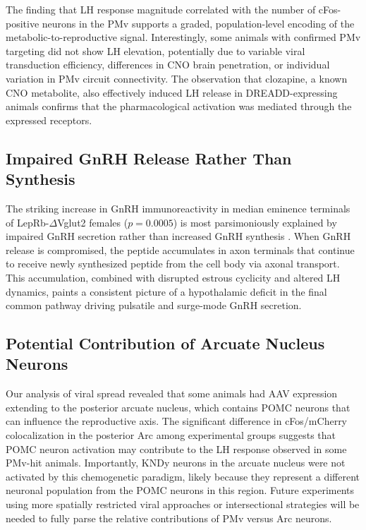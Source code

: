 \documentclass[12pt]{article}
\begin{document}
The finding that LH response magnitude correlated with the number of cFos-positive neurons in the PMv supports a graded, population-level encoding of the metabolic-to-reproductive signal. Interestingly, some animals with confirmed PMv targeting did not show LH elevation, potentially due to variable viral transduction efficiency, differences in CNO brain penetration, or individual variation in PMv circuit connectivity. The observation that clozapine, a known CNO metabolite, also effectively induced LH release in DREADD-expressing animals confirms that the pharmacological activation was mediated through the expressed receptors.

\subsection{Impaired GnRH Release Rather Than Synthesis}

The striking increase in GnRH immunoreactivity in median eminence terminals of LepRb-$\Delta$Vglut2 females ($p = 0.0005$) is most parsimoniously explained by impaired GnRH secretion rather than increased GnRH synthesis \citep{herbison2016gnrh, manfredi2019gnrh}. When GnRH release is compromised, the peptide accumulates in axon terminals that continue to receive newly synthesized peptide from the cell body via axonal transport. This accumulation, combined with disrupted estrous cyclicity and altered LH dynamics, paints a consistent picture of a hypothalamic deficit in the final common pathway driving pulsatile and surge-mode GnRH secretion.

\subsection{Potential Contribution of Arcuate Nucleus Neurons}

Our analysis of viral spread revealed that some animals had AAV expression extending to the posterior arcuate nucleus, which contains POMC neurons that can influence the reproductive axis. The significant difference in cFos/mCherry colocalization in the posterior Arc among experimental groups suggests that POMC neuron activation may contribute to the LH response observed in some PMv-hit animals. Importantly, KNDy neurons in the arcuate nucleus were not activated by this chemogenetic paradigm, likely because they represent a different neuronal population from the POMC neurons in this region. Future experiments using more spatially restricted viral approaches or intersectional strategies will be needed to fully parse the relative contributions of PMv versus Arc neurons.
\end{document}
